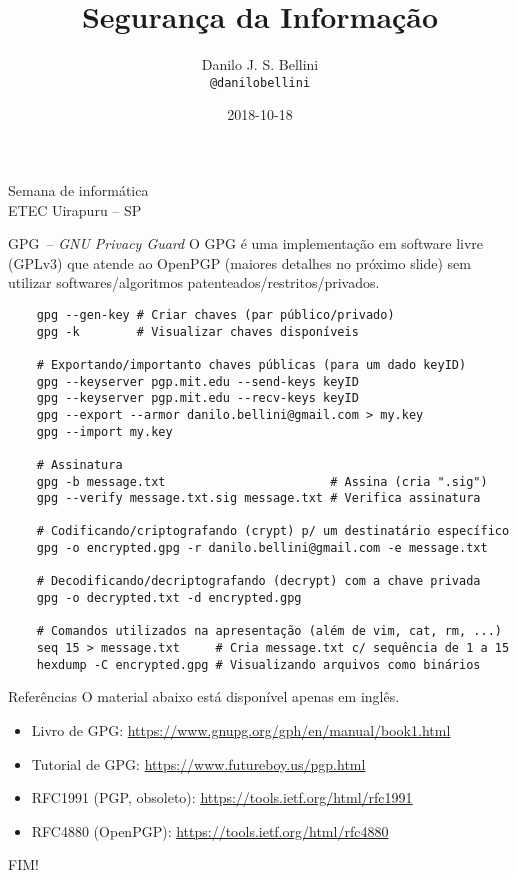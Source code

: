 \documentclass[utf8]{beamer}
\title{Segurança da Informação}
\author{Danilo J. S. Bellini \\ \texttt{@danilobellini}}
\date{2018-10-18}
\begin{document}
\begin{frame}
  \titlepage
  \center Semana de informática \\ ETEC Uirapuru -- SP
\end{frame}


\begin{frame}[fragile]{GPG~-- \emph{GNU Privacy Guard}}
  O GPG é uma implementação em software livre (GPLv3)
  que atende ao OpenPGP (maiores detalhes no próximo slide)
  sem utilizar softwares/algoritmos patenteados/restritos/privados.
  \begin{verbatim}
    gpg --gen-key # Criar chaves (par público/privado)
    gpg -k        # Visualizar chaves disponíveis

    # Exportando/importanto chaves públicas (para um dado keyID)
    gpg --keyserver pgp.mit.edu --send-keys keyID
    gpg --keyserver pgp.mit.edu --recv-keys keyID
    gpg --export --armor danilo.bellini@gmail.com > my.key
    gpg --import my.key

    # Assinatura
    gpg -b message.txt                       # Assina (cria ".sig")
    gpg --verify message.txt.sig message.txt # Verifica assinatura

    # Codificando/criptografando (crypt) p/ um destinatário específico
    gpg -o encrypted.gpg -r danilo.bellini@gmail.com -e message.txt

    # Decodificando/decriptografando (decrypt) com a chave privada
    gpg -o decrypted.txt -d encrypted.gpg

    # Comandos utilizados na apresentação (além de vim, cat, rm, ...)
    seq 15 > message.txt     # Cria message.txt c/ sequência de 1 a 15
    hexdump -C encrypted.gpg # Visualizando arquivos como binários
  \end{verbatim}
\end{frame}


\begin{frame}{Referências}
  O material abaixo está disponível apenas em inglês.
  \begin{itemize}
    \item Livro de GPG:
          \url{https://www.gnupg.org/gph/en/manual/book1.html}
    \item Tutorial de GPG:
          \url{https://www.futureboy.us/pgp.html}
    \item RFC1991 (PGP, obsoleto):
          \url{https://tools.ietf.org/html/rfc1991}
    \item RFC4880 (OpenPGP):
          \url{https://tools.ietf.org/html/rfc4880}
  \end{itemize}
\end{frame}


\begin{frame}
  \begin{center}\fontsize{5cm}{2.5cm}\selectfont
    FIM!
  \end{center}
\end{frame}
\end{document}
